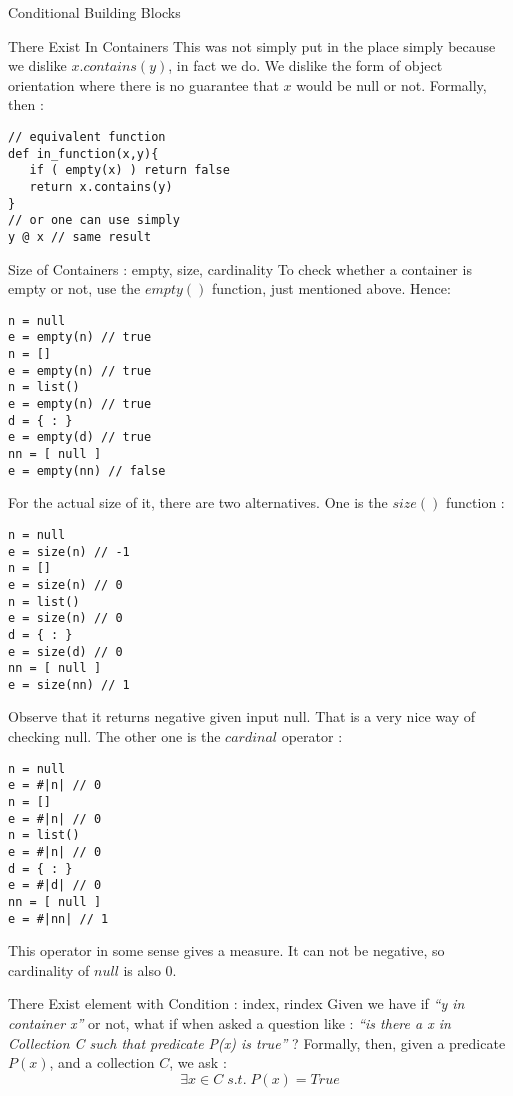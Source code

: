 \begin{section}{Conditional Building Blocks}
\begin{subsection}{There Exist In Containers}
This was not simply put in the place simply because we dislike $x.contains(y)$, in fact we do.
We dislike the form of object orientation where there is no guarantee that $x$ would be null or not.
Formally, then :

\begin{lstlisting}[style=JexlStyle]
// equivalent function 
def in_function(x,y){
   if ( empty(x) ) return false 
   return x.contains(y) 
}
// or one can use simply 
y @ x // same result
\end{lstlisting}
\end{subsection}

\begin{subsection}{Size of Containers : empty, size, cardinality}
To check whether a container is empty or not, 
use the $empty()$  function, just mentioned above. Hence:
\begin{lstlisting}[style=JexlStyle]
n = null
e = empty(n) // true 
n = []
e = empty(n) // true 
n = list()
e = empty(n) // true 
d = { : }
e = empty(d) // true 
nn = [ null ]
e = empty(nn) // false 
\end{lstlisting}

For the actual size of it, there are two alternatives.
One is the $size()$   function :

\begin{center}\begin{minipage}{\linewidth}
\begin{lstlisting}[style=JexlStyle]
n = null
e = size(n) // -1 
n = []
e = size(n) // 0 
n = list()
e = size(n) // 0 
d = { : }
e = size(d) // 0 
nn = [ null ]
e = size(nn) // 1 
\end{lstlisting}
\end{minipage}\end{center}

Observe that it returns negative given input null. 
That is a very nice way of checking null.
The other one is the $cardinal$ operator :

\begin{lstlisting}[style=JexlStyle]
n = null
e = #|n| // 0 
n = []
e = #|n| // 0 
n = list()
e = #|n| // 0 
d = { : }
e = #|d| // 0 
nn = [ null ]
e = #|nn| // 1 
\end{lstlisting}
This operator in some sense gives a measure. It can not be negative, 
so cardinality of $null$ is also 0. 
\end{subsection}

\begin{subsection}{There Exist element with Condition : index, rindex }
Given we have if \emph{``y in container x''} or not,
what if when asked a question like : \emph{ ``is there a x in Collection C such that predicate P(x) is true''} ?
Formally, then, given a predicate $P(x)$, and a collection $C$, we ask :
$$
\exists x \in C \;s.t.\; P(x) = True
$$


\end{subsection}
\end{section}
